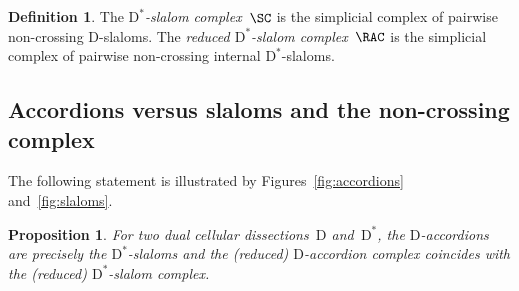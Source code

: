 \documentclass{amsart}
\newtheorem{proposition}[theorem]{Proposition}
\theoremstyle{definition}
\newtheorem{definition}[theorem]{Definition}
\newtheorem{remark}[theorem]{Remark}
\newcommand{\darkblue}{\color{darkblue}} %
\newcommand{\defn}[1]{\textsl{\darkblue #1}} %
\newcommand{\dual}{^*} %
\newcommand{\dissection}{\mathrm{D}} %
\begin{document}
\begin{definition}
\label{def:slalomComplex}
The \defn{$\dissection\dual$-slalom complex}~$\SC$ is the simplicial complex of pairwise non-crossing $\dissection$-slaloms.
The \defn{reduced $\dissection\dual$-slalom complex}~$\RAC$ is the simplicial complex of pairwise non-crossing internal $\dissection\dual$-slaloms.
\end{definition}


\subsection{Accordions versus slaloms and the non-crossing complex}
\label{subsec:accordionsVSSlaloms}

The following statement is illustrated by Figures~\ref{fig:accordions} and~\ref{fig:slaloms}.

\begin{proposition}
\label{prop:accordionsSlaloms}
For two dual cellular dissections~$\dissection$ and~$\dissection\dual$, the $\dissection$-accordions are precisely the $\dissection\dual$-slaloms and the (reduced) $\dissection$-accordion complex coincides with the (reduced) $\dissection\dual$-slalom complex.
\end{proposition}
\end{document}
